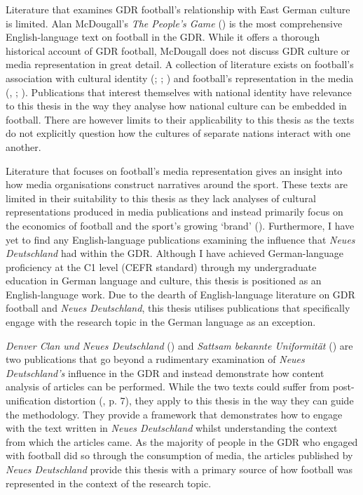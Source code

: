 Literature that examines GDR football’s relationship with East German culture is limited. Alan McDougall’s \textit{The People’s Game} (\citeyear{mcdougall2014}) is the most comprehensive English-language text on football in the GDR. While it offers a thorough historical account of GDR football, McDougall does not discuss GDR culture or media representation in great detail. A collection of literature exists on football’s association with cultural identity (\cite{archetti1994}; \cite{gibbons2014}; \cite{bocketti2016}) and football’s representation in the media (\cite{boylehaynes2004}, \cite{bridgewater2010}; \cite{miller2011}). Publications that interest themselves with national identity have relevance to this thesis in the way they analyse how national culture can be embedded in football. There are however limits to their applicability to this thesis as the texts do not explicitly question how the cultures of separate nations interact with one another.

Literature that focuses on football’s media representation gives an insight into how media organisations construct narratives around the sport. These texts are limited in their suitability to this thesis as they lack analyses of cultural representations produced in media publications and instead primarily focus on the economics of football and the sport’s growing ‘brand’ (\cite{bridgewater2010}). Furthermore, I have yet to find any English-language publications examining the influence that \textit{Neues Deutschland} had within the GDR. Although I have achieved German-language proficiency at the C1 level (CEFR standard) through my undergraduate education in German language and culture, this thesis is positioned as an English-language work. Due to the dearth of English-language literature on GDR football and \textit{Neues Deutschland}, this thesis utilises publications that specifically engage with the research topic in the German language as an exception.

\textit{Denver Clan und Neues Deutschland} (\cite{meyen2003}) and \textit{Sattsam bekannte Uniformität} (\cite{meyenschweiger2008}) are two publications that go beyond a rudimentary examination of \textit{Neues Deutschland’s} influence in the GDR and instead demonstrate how content analysis of articles can be performed. While the two texts could suffer from post-unification distortion (\cite{fullbrook1995}, p. 7), they apply to this thesis in the way they can guide the methodology. They provide a framework that demonstrates how to engage with the text written in \textit{Neues Deutschland} whilst understanding the context from which the articles came. As the majority of people in the GDR who engaged with football did so through the consumption of media, the articles published by \textit{Neues Deutschland} provide this thesis with a primary source of how football was represented in the context of the research topic.

